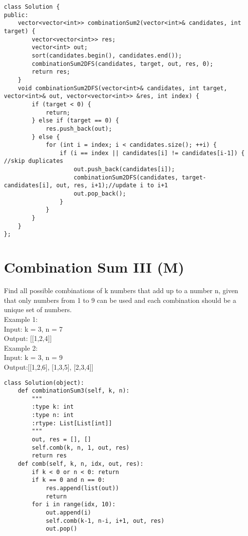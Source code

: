 \begin{lstlisting}
class Solution {
public:
    vector<vector<int>> combinationSum2(vector<int>& candidates, int target) {
        vector<vector<int>> res;
        vector<int> out;
        sort(candidates.begin(), candidates.end());
        combinationSum2DFS(candidates, target, out, res, 0);
        return res;        
    }
    void combinationSum2DFS(vector<int>& candidates, int target, vector<int>& out, vector<vector<int>> &res, int index) {
        if (target < 0) {
            return;
        } else if (target == 0) {
            res.push_back(out);
        } else {
            for (int i = index; i < candidates.size(); ++i) {
                if (i == index || candidates[i] != candidates[i-1]) { //skip duplicates
                    out.push_back(candidates[i]);
                    combinationSum2DFS(candidates, target-candidates[i], out, res, i+1);//update i to i+1
                    out.pop_back();
                }
            } 
        }
    }
};
\end{lstlisting}


\section{Combination Sum III (M)}
Find all possible combinations of k numbers that add up to a number n, given that only numbers from 1 to 9 can be used and each combination should be a unique set of numbers. \\

Example 1:\\
Input: k = 3, n = 7\\
Output: [[1,2,4]]\\

Example 2:\\
Input: k = 3, n = 9\\
Output:[[1,2,6], [1,3,5], [2,3,4]]\\

\begin{lstlisting}
class Solution(object):
    def combinationSum3(self, k, n):
        """
        :type k: int
        :type n: int
        :rtype: List[List[int]]
        """
        out, res = [], []
        self.comb(k, n, 1, out, res)
        return res
    def comb(self, k, n, idx, out, res):
        if k < 0 or n < 0: return
        if k == 0 and n == 0: 
            res.append(list(out))
            return
        for i in range(idx, 10):
            out.append(i)
            self.comb(k-1, n-i, i+1, out, res)
            out.pop()
\end{lstlisting}

